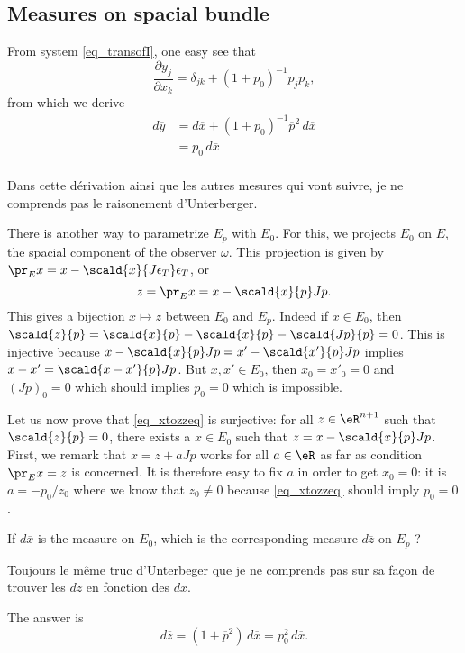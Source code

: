 \subsection{Measures on spacial bundle}

From system \eqref{eq_transofI}, one easy see that
\[ 
\frac{ \partial y_j }{ \partial x_k }=\delta_{jk}+(1+p_0)^{-1}p_jp_k,
\]
from which we derive
\begin{equation}
\begin{split}
d\overline{y}&=d\overline{x}+(1+p_0)^{-1}\overline{p}^2\,d\overline{x}\\
		&=p_0\,d\overline{x}\\
 \end{split}
\end{equation}


\begin{probleme}
Dans cette dérivation ainsi que les autres mesures qui vont suivre, je ne comprends pas le raisonement d'Unterberger.
\end{probleme}

There is another way to parametrize $E_p$ with $E_0$. For this, we projects $E_0$ on $E$, the spacial component of the observer $\omega$. This projection is given by $\pr_Ex=x-\scald{ x }{ J\epsilon_T }\epsilon_T$, or
\begin{equation} \label{eq_xtozzeq}
z=\pr_Ex=x-\scald{ x }{ p }Jp.
\end{equation}
This gives a bijection $x\mapsto z$ between $E_0$ and $E_p$. Indeed if $x\in E_0$, then $\scald{ z }{ p }=\scald{ x }{ p }-\scald{ x }{ p }-\scald{ Jp }{ p }=0$. This is injective because $x-\scald{ x }{ p }Jp=x'-\scald{ x' }{ p }Jp$ implies $x-x'=\scald{ x-x' }{ p }Jp$. But $x,x'\in E_0$, then $x_0=x'_0=0$ and $(Jp)_0=0$ which should implies $p_0=0$ which is impossible.

 Let us now prove that \eqref{eq_xtozzeq} is surjective: for all $z\in\eR^{n+1}$ such that $\scald{ z }{ p }=0$, there exists a $x\in E_0$ such that $z=x-\scald{ x }{ p }Jp$. First, we remark that $x=z+aJp$ works for all $a\in \eR$ as far as condition $\pr_Ex=z$ is concerned. It is therefore easy to fix $a$ in order to get $x_0=0$: it is $a=-p_0/z_0$ where we know that $z_0\neq 0$ because \eqref{eq_xtozzeq} should imply $p_0=0$.


If $d\overline{x}$ is the measure on $E_0$, which is the corresponding measure $d\overline{ z }$ on $E_p$ ?

\begin{probleme}
Toujours le même truc d'Unterbeger que je ne comprends pas sur sa façon de trouver les $d\overline{ z }$ en fonction des $d\overline{ x }$.
\end{probleme}
The answer is 
\begin{equation}
  d\overline{ z }=(1+\overline{p}^2)\,d\overline{x}=p_0^2\,d\overline{x}.
\end{equation}

